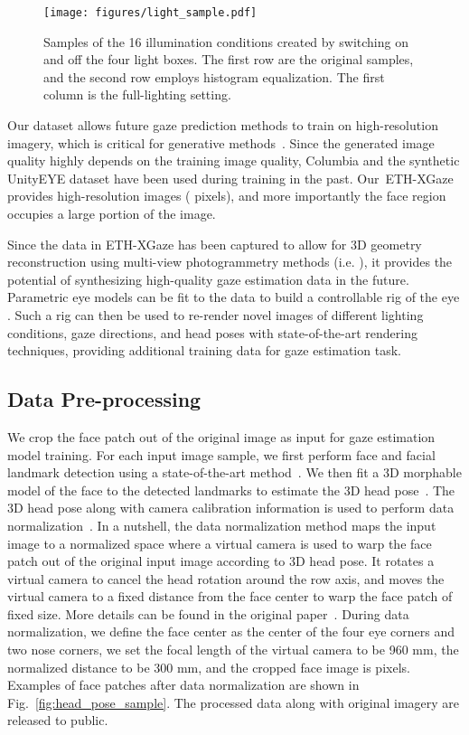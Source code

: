 \documentclass[runningheads]{llncs}
\newcommand{\datasetname}{ETH-XGaze\xspace}
\begin{document}
\begin{figure}[t]
    \centering
    \texttt{[image: figures/light\_sample.pdf]}
    \caption{Samples of the 16 illumination conditions created by switching on and off the four light boxes. The first row are the original samples, and the second row employs histogram equalization. The first column is the full-lighting setting.}
    \label{fig:lighting_sample}
\end{figure}

Our dataset allows future gaze prediction methods to train on high-resolution imagery, which is critical for generative methods~\cite{He_2019_ICCV,Park2019ICCV,yu2019improving,Wang_2018_CVPR}.
Since the generated image quality highly depends on the training image quality, Columbia and the synthetic UnityEYE dataset have been used during training in the past. 
Our~\datasetname provides high-resolution images ( pixels), and more importantly the face region occupies a large portion of the image.

Since the data in \datasetname has been captured to allow for 3D geometry reconstruction using multi-view photogrammetry methods (i.e. \cite{beeler2010high}), it provides the potential of synthesizing high-quality gaze estimation data in the future. Parametric eye models \cite{wood20163d,berard2016lightweight} can be fit to the data to build a controllable rig of the eye \cite{berard2019practical}.
Such a rig can then be used to re-render novel images of different lighting conditions, gaze directions, and head poses with state-of-the-art rendering techniques, providing additional training data for gaze estimation task.


\subsection{Data Pre-processing}
\label{sec:data_preprocess}

We crop the face patch out of the original image as input for gaze estimation model training.
For each input image sample, we first perform face and facial landmark detection using a state-of-the-art method~\cite{bulat2017far}.
We then fit a 3D morphable model of the face to the detected landmarks to estimate the 3D head pose~\cite{huber2016multiresolution}.
The 3D head pose along with camera calibration information is used to perform data normalization~\cite{zhang2018revisiting}.
In a nutshell, the data normalization method maps the input image to a normalized space where a virtual camera is used to warp the face patch out of the original input image according to 3D head pose.
It rotates a virtual camera to cancel the head rotation around the row axis, and moves the virtual camera to a fixed distance from the face center to warp the face patch of fixed size.
More details can be found in the original paper~\cite{zhang2018revisiting}.
During data normalization, we define the face center as the center of the four eye corners and two nose corners, we set the focal length of the virtual camera to be 960 mm, the normalized distance to be 300 mm, and the cropped face image is  pixels.
Examples of face patches after data normalization are shown in Fig.~\ref{fig:head_pose_sample}.
The processed data along with original imagery are released to public.
\end{document}
